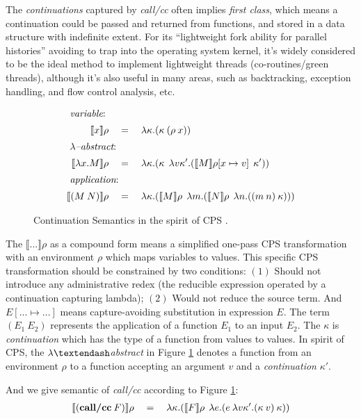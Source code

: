 \documentclass[numbers,numberedpars]{sigplanconf}
\begin{document}
The {\it continuations} captured by {\it call/cc} often implies {\it first class}, which means a continuation could be passed and returned from functions, and stored in a data structure with indefinite extent. For its ``lightweight fork ability for parallel histories'' avoiding to trap into the operating system kernel, it's widely considered
to be the ideal method to implement lightweight threads (co-routines/green threads), although it's also useful in many areas, such as backtracking, exception handling, and flow control analysis, etc.


\begin{figure}[tbph]
  \raggedright
  \begin{align*}
    \shortintertext{ {\it variable}: }
    \llbracket{x}\rrbracket\rho \quad&=\quad \lambda{\kappa}.(\kappa \: (\rho \: x))
    \\
    \shortintertext{ {\it $\lambda$\textendash abstract}: }
    \llbracket{\lambda{x}.M}\rrbracket\rho \quad&=\quad
    \lambda{\kappa}.(\kappa\:\:\lambda{v\kappa'}.(\llbracket{M}\rrbracket\rho[x \mapsto v]\:\:\kappa'))
    \\
    \shortintertext{ {\it application}: }
    \llbracket{(M\:N)}\rrbracket\rho \quad&=\quad
    \lambda{\kappa}.(\llbracket{M}\rrbracket\rho\:\:\lambda{m}.(\llbracket{N}\rrbracket\rho\:\:\lambda{n}.((m\:n)\:\kappa)))
  \end{align*}
  \caption{Continuation Semantics in the spirit of CPS
    \citep{Danvy92representingcontrol:}\citep{Gasbichler:2002:FSC:581478.581504}.}
    \label{fig:cont_sema}
\end{figure}

The $\llbracket{...}\rrbracket\rho$ as a compound form means a simplified one-pass CPS transformation with an environment $\rho$ which maps variables to values. This specific CPS transformation should be constrained by two conditions:
$(1)$ Should not introduce any administrative redex (the reducible expression operated by a continuation capturing lambda);
$(2)$ Would not reduce the source term. And $E[...\mapsto...]$ means capture-avoiding substitution in expression $E$.
The term $(E_1\:E_2)$ represents the application of a function $E_1$ to an input $E_2$. The $\kappa$ is {\it continuation} which has the type of a function from values to values. In spirit of CPS,
the $\lambda\textendash${\it abstract} in Figure \ref{fig:cont_sema} denotes a function from an environment $\rho$ to a function
accepting an argument $v$ and a {\it continuation} $\kappa'$.

And we give semantic of {\it call/cc} according to Figure \ref{fig:cont_sema}:
\begin{align*}
  \llbracket{(\text{{\bf call/cc}}\:F)}\rrbracket\rho \quad=\quad
  \lambda{\kappa}.(\llbracket{F}\rrbracket\rho\:\: \lambda{e}.(e\: \lambda{v\kappa'}.(\kappa\:v)\: \kappa))
\end{align*}
\end{document}
